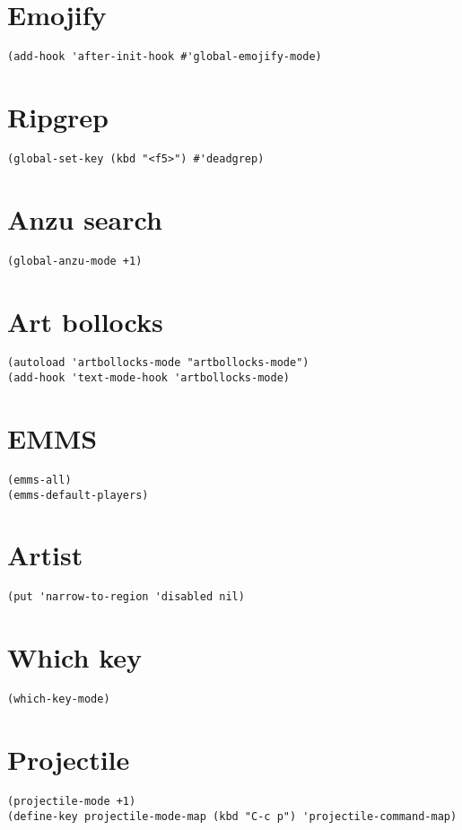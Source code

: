 \documentclass[11pt]{article}
\begin{document}
\section{Emojify}
\label{sec:org044d5f5}
\begin{verbatim}
(add-hook 'after-init-hook #'global-emojify-mode)
\end{verbatim}
\section{Ripgrep}
\label{sec:orgb83dd69}
\begin{verbatim}
(global-set-key (kbd "<f5>") #'deadgrep)
\end{verbatim}
\section{Anzu search}
\label{sec:org37411ab}
\begin{verbatim}
(global-anzu-mode +1)
\end{verbatim}
\section{Art bollocks}
\label{sec:org34e10d8}
\begin{verbatim}
(autoload 'artbollocks-mode "artbollocks-mode")
(add-hook 'text-mode-hook 'artbollocks-mode)
\end{verbatim}
\section{EMMS}
\label{sec:org320e800}
\begin{verbatim}
(emms-all)
(emms-default-players)
\end{verbatim}
\section{Artist}
\label{sec:orgc3b9894}
\begin{verbatim}
(put 'narrow-to-region 'disabled nil)
\end{verbatim}
\section{Which key}
\label{sec:org6a6eb1e}
\begin{verbatim}
(which-key-mode)
\end{verbatim}
\section{Projectile}
\label{sec:orgf1c1944}
\begin{verbatim}
(projectile-mode +1)
(define-key projectile-mode-map (kbd "C-c p") 'projectile-command-map)
\end{verbatim}
\end{document}
